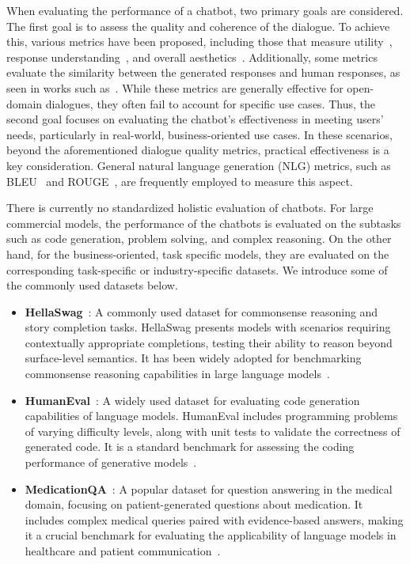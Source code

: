When evaluating the performance of a chatbot, two primary goals are considered. The first goal is to assess the quality and coherence of the dialogue. To achieve this, various metrics have been proposed, including those that measure utility~\cite{Cameron2019}, response understanding~\cite{Yokotani2018}, and overall aesthetics~\cite{Wargnier2018}. Additionally, some metrics evaluate the similarity between the generated responses and human responses, as seen in works such as~\cite{Adiwardana2020, Xu2022}. While these metrics are generally effective for open-domain dialogues, they often fail to account for specific use cases. Thus, the second goal focuses on evaluating the chatbot's effectiveness in meeting users' needs, particularly in real-world, business-oriented use cases. In these scenarios, beyond the aforementioned dialogue quality metrics, practical effectiveness is a key consideration. General natural language generation (NLG) metrics, such as BLEU~\cite{10.3115/1073083.1073135} and ROUGE~\cite{lin2004rouge}, are frequently employed to measure this aspect.

There is currently no standardized holistic evaluation of chatbots. For large commercial models, the performance of the chatbots is evaluated on the subtasks such as code generation, problem solving, and complex reasoning. On the other hand, for the business-oriented, task specific models, they are evaluated on the corresponding task-specific or industry-specific datasets. We introduce some of the commonly used datasets below. 

\begin{itemize}
    \item \textbf{HellaSwag}~\cite{zellers2019hellaswag}: A commonly used dataset for commonsense reasoning and story completion tasks. HellaSwag presents models with scenarios requiring contextually appropriate completions, testing their ability to reason beyond surface-level semantics. It has been widely adopted for benchmarking commonsense reasoning capabilities in large language models~\cite{openai2024gpt4technicalreport, brown2020languagemodelsfewshotlearners}.
    
    \item \textbf{HumanEval}~\cite{chen2021evaluatinglargelanguagemodels}: A widely used dataset for evaluating code generation capabilities of language models. HumanEval includes programming problems of varying difficulty levels, along with unit tests to validate the correctness of generated code. It is a standard benchmark for assessing the coding performance of generative models~\cite{openai2024gpt4technicalreport}.
    
    \item \textbf{MedicationQA}~\cite{benabacha2019bridging}: A popular dataset for question answering in the medical domain, focusing on patient-generated questions about medication. It includes complex medical queries paired with evidence-based answers, making it a crucial benchmark for evaluating the applicability of language models in healthcare and patient communication~\cite{openai2024gpt4technicalreport, lee2023gpt4medicine}.
\end{itemize}

